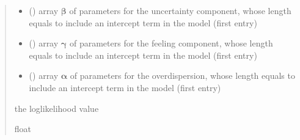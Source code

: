 \documentclass[letterpaper,10pt,english]{sphinxmanual}
\begin{document}
\begin{fulllineitems}
\begin{quote}
\begin{description}
\begin{itemize}
\item {} 
\sphinxAtStartPar
{} () \textendash{} array \(\pmb \beta\) of parameters for the uncertainty component, whose length equals 
 to include an intercept term in the model (first entry)

\item {} 
\sphinxAtStartPar
{} () \textendash{} array \(\pmb \gamma\) of parameters for the feeling component, whose length equals 
 to include an intercept term in the model (first entry)

\item {} 
\sphinxAtStartPar
{} () \textendash{} array \(\pmb \alpha\) of parameters for the overdispersion, whose length equals 
 to include an intercept term in the model (first entry)

\end{itemize}

\sphinxAtStartPar
the log\sphinxhyphen{}likelihood value

\sphinxAtStartPar
float

\end{description}\end{quote}

\end{fulllineitems}

\end{document}
